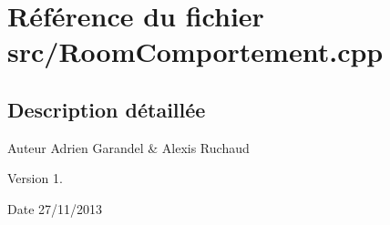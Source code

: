 \section{Référence du fichier src/\-Room\-Comportement.cpp}
\label{_room_comportement_8cpp}


\subsection{Description détaillée}
\begin{DoxyAuthor}{Auteur}
Adrien Garandel \& Alexis Ruchaud 
\end{DoxyAuthor}
\begin{DoxyVersion}{Version}
1. 
\end{DoxyVersion}
\begin{DoxyDate}{Date}
27/11/2013 
\end{DoxyDate}
